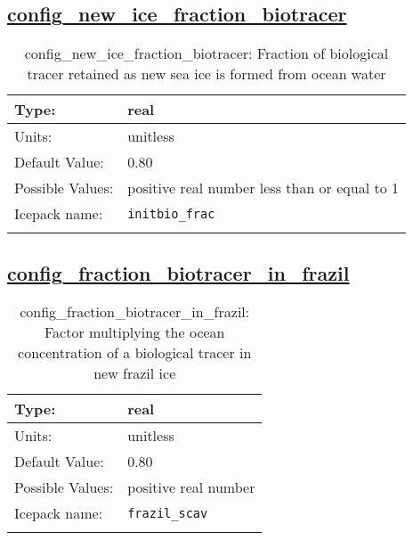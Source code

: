 \subsection[config\_new\_ice\_fraction\_biotracer]{\hyperref[sec:nm_tab_biogeochemistry]{config\_new\_ice\_fraction\_biotracer}}
\label{subsec:nm_sec_config_new_ice_fraction_biotracer}
\begin{center}
\begin{longtable}{| p{2.0in} || p{4.0in} |}
    \hline
    Type: & real \\
    \hline
    Units: & \si{unitless} \\
    \hline
    Default Value: & 0.80 \\
    \hline
    Possible Values: & positive real number less than or equal to 1 \\
    \hline
    Icepack name: & \verb+initbio_frac+ \\
    \hline
    \caption{config\_new\_ice\_fraction\_biotracer: Fraction of biological tracer retained as new sea ice is formed from ocean water}
\end{longtable}
\end{center}
\subsection[config\_fraction\_biotracer\_in\_frazil]{\hyperref[sec:nm_tab_biogeochemistry]{config\_fraction\_biotracer\_in\_frazil}}
\label{subsec:nm_sec_config_fraction_biotracer_in_frazil}
\begin{center}
\begin{longtable}{| p{2.0in} || p{4.0in} |}
    \hline
    Type: & real \\
    \hline
    Units: & \si{unitless} \\
    \hline
    Default Value: & 0.80 \\
    \hline
    Possible Values: & positive real number \\
    \hline
    Icepack name: & \verb+frazil_scav+ \\
    \hline
    \caption{config\_fraction\_biotracer\_in\_frazil: Factor multiplying the ocean concentration of a biological tracer in new frazil ice}
\end{longtable}
\end{center}
